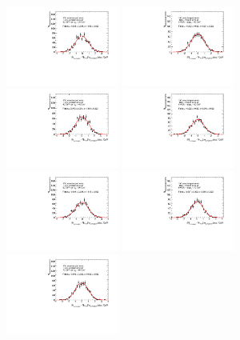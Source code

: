 \begin{figure}
\includegraphics[width=0.33\textwidth]{fig/UnfoldPull/SingleSlicePull1.pdf}
\includegraphics[width=0.33\textwidth]{fig/UnfoldPull/SingleSlicePull2.pdf}
\includegraphics[width=0.33\textwidth]{fig/UnfoldPull/SingleSlicePull3.pdf}
%
\includegraphics[width=0.33\textwidth]{fig/UnfoldPull/SingleSlicePull4.pdf}
\includegraphics[width=0.33\textwidth]{fig/UnfoldPull/SingleSlicePull5.pdf}
\includegraphics[width=0.33\textwidth]{fig/UnfoldPull/SingleSlicePull6.pdf}
%
\includegraphics[width=0.33\textwidth]{fig/UnfoldPull/SingleSlicePull7.pdf}

\end{figure}
